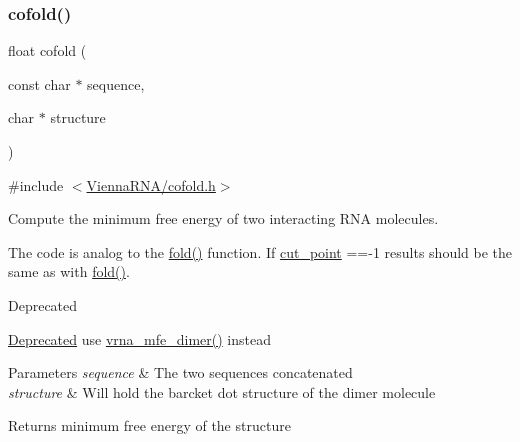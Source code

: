 \subsubsection{\texorpdfstring{cofold()}{cofold()}}
{\footnotesize\ttfamily float cofold (\begin{DoxyParamCaption}\item[{const char $\ast$}]{sequence,  }\item[{char $\ast$}]{structure }\end{DoxyParamCaption})}



{\ttfamily \#include $<$\mbox{\hyperlink{cofold_8h}{Vienna\+R\+N\+A/cofold.\+h}}$>$}



Compute the minimum free energy of two interacting R\+NA molecules. 

The code is analog to the \mbox{\hyperlink{group__mfe__global__deprecated_gaadafcb0f140795ae62e5ca027e335a9b}{fold()}} function. If \mbox{\hyperlink{fold__vars_8h_ab9b2c3a37a5516614c06d0ab54b97cda}{cut\+\_\+point}} ==-\/1 results should be the same as with \mbox{\hyperlink{group__mfe__global__deprecated_gaadafcb0f140795ae62e5ca027e335a9b}{fold()}}.

\begin{DoxyRefDesc}{Deprecated}
\item[\mbox{\hyperlink{deprecated__deprecated000030}{Deprecated}}]use \mbox{\hyperlink{group__mfe__global_gaab22d10c1190f205f16a77cab9d5d3ee}{vrna\+\_\+mfe\+\_\+dimer()}} instead\end{DoxyRefDesc}



\begin{DoxyParams}{Parameters}
{\em sequence} & The two sequences concatenated \\
\hline
{\em structure} & Will hold the barcket dot structure of the dimer molecule \\
\hline
\end{DoxyParams}
\begin{DoxyReturn}{Returns}
minimum free energy of the structure 
\end{DoxyReturn}
\mbox{\label{group__mfe__global__deprecated_ga7612cfeeb1b793f1e4179b1eb53df1f3}} 
